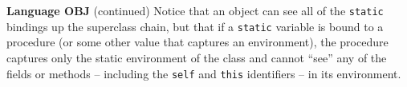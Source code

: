 \begin{minipage}[t]{\sw}
\slidenumber
\LARGE
{\bf Language OBJ} (continued)\exx
Notice that an object can see all
of the \verb'static' bindings up the superclass chain,
but that if a \verb'static' variable is bound to a procedure
(or some other value that captures an environment),
the procedure captures only the static environment of the class
and cannot ``see'' any of the fields or methods --
including the \verb'self' and \verb'this' identifiers --
in its environment.
\end{minipage}
